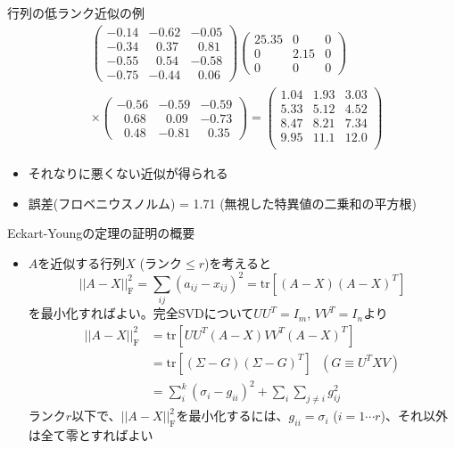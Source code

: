 \begin{frame}[t,fragile]{行列の低ランク近似の例}
  \[
  \begin{split}
    &\begin{pmatrix}
      -0.14 & -0.62 & -0.05 \\
      -0.34 & \ \ \,0.37 & \ \ \,0.81 \\
      -0.55 & \ \ \,0.54 & -0.58 \\
      -0.75 & -0.44 & \ \ \,0.06      
    \end{pmatrix}
    \begin{pmatrix}
      25.35 & 0 & 0 \\
      0 & 2.15 & 0 \\
      0 & 0 & 0
    \end{pmatrix} \\
    & \times
    \begin{pmatrix}
      -0.56 & -0.59 & -0.59 \\
      \ \ \,0.68 & \ \ \,0.09 & -0.73 \\
      \ \ \,0.48 & -0.81 & \ \ \,0.35
    \end{pmatrix}
    = 
    \begin{pmatrix}
      1.04 & 1.93 & 3.03 \\
      5.33 & 5.12 & 4.52 \\
      8.47 & 8.21 & 7.34 \\
      9.95 & 11.1 & 12.0 \\
    \end{pmatrix}
  \end{split}
  \]
  \begin{itemize}
  \item それなりに悪くない近似が得られる
  \item 誤差(フロベニウスノルム) = 1.71 (無視した特異値の二乗和の平方根)
  \end{itemize}
\end{frame}

\begin{frame}[t,fragile]{Eckart-Youngの定理の証明の概要}
  \begin{itemize}
  \item $A$を近似する行列$X$ (ランク$\le r$)を考えると
    \[
    ||A-X||_\mathrm{F}^2 = \sum_{ij}(a_{ij}-x_{ij})^2 = \text{tr} [(A-X)(A-X)^T]
    \]
    を最小化すればよい。完全SVDについて$UU^T=I_m$, $VV^T = I_n$より
    \[
    \begin{split}
      ||A-X||_\mathrm{F}^2 &= \text{tr} [UU^T(A-X)VV^T(A-X)^T] \\
      &= \text{tr} [(\Sigma-G)(\Sigma-G)^T]  \ \ \ (G \equiv U^TXV)\\
      &= \sum_i^k (\sigma_i - g_{ii})^2 + \sum_i \sum_{j \ne i} g_{ij}^2
    \end{split}
    \]
    ランク$r$以下で、$||A-X||_\mathrm{F}^2$を最小化するには、$g_{ii}=\sigma_i$ ($i=1 \cdots r$)、それ以外は全て零とすればよい
  \end{itemize}
\end{frame}

